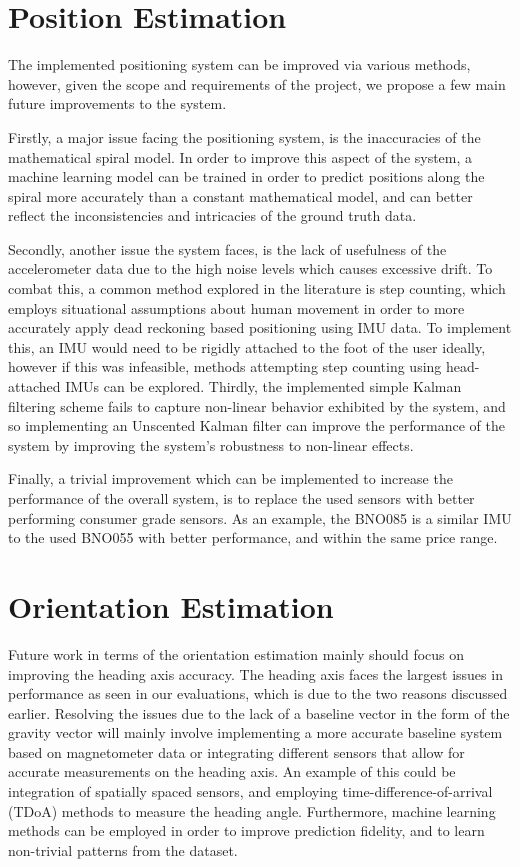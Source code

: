\section{Position Estimation}
The implemented positioning system can be improved via various methods, however, given the scope and requirements of the project, we propose a few main future improvements to the system. 

Firstly, a major issue facing the positioning system, is the inaccuracies of the mathematical spiral model. In order to improve this aspect of the system, a machine learning model can be trained in order to predict positions along the spiral more accurately than a constant mathematical model, and can better reflect the inconsistencies and intricacies of the ground truth data.

Secondly, another issue the system faces, is the lack of usefulness of the accelerometer data due to the high noise levels which causes excessive drift. To combat this, a common method explored in the literature is step counting, which employs situational assumptions about human movement in order to more accurately apply dead reckoning based positioning using IMU data. To implement this, an IMU would need to be rigidly attached to the foot of the user ideally, however if this was infeasible, methods attempting step counting using head-attached IMUs can be explored. \cite{huang_2022_improvement, tiwari_2022_a}
Thirdly, the implemented simple Kalman filtering scheme fails to capture non-linear behavior exhibited by the system, and so implementing an Unscented Kalman filter \cite{bernalpolo_2019_kalman} can improve the performance of the system by improving the system's robustness to non-linear effects.

Finally, a trivial improvement which can be implemented to increase the performance of the overall system, is to replace the used sensors with better performing consumer grade sensors. As an example, the BNO085 is a similar IMU to the used BNO055 with better performance, and within the same price range.


\section{Orientation Estimation}
Future work in terms of the orientation estimation mainly should focus on improving the heading axis accuracy. The heading axis faces the largest issues in performance as seen in our evaluations, which is due to the two reasons discussed earlier. Resolving the issues due to the lack of a baseline vector in the form of the gravity vector will mainly involve implementing a more accurate baseline system based on magnetometer data or integrating different sensors that allow for accurate measurements on the heading axis. An example of this could be integration of spatially spaced sensors, and employing time-difference-of-arrival (TDoA) methods to measure the heading angle. \cite{stanculeanu_2012_enhanced} Furthermore, machine learning methods can be employed in order to improve prediction fidelity, and to learn non-trivial patterns from the dataset. \cite{yan_2019_ronin}

